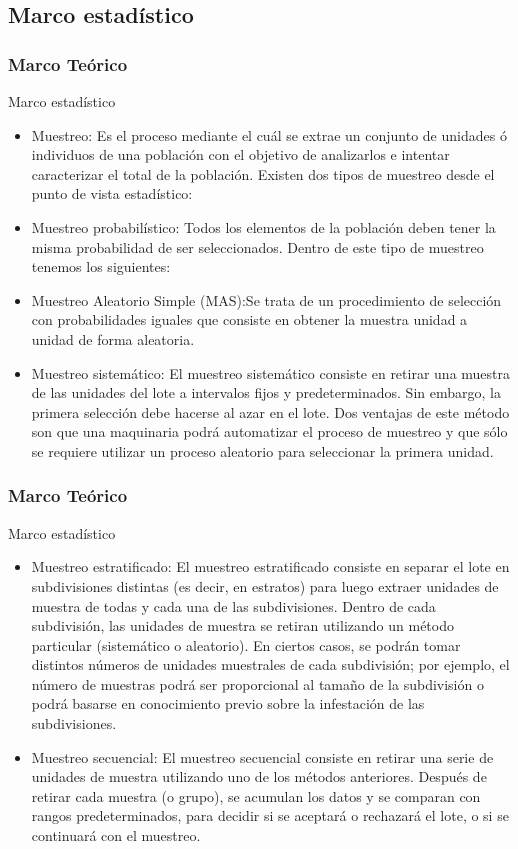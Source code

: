 \documentclass[10pt]{beamer}
\begin{document}
\subsection{Marco estadístico}
\begin{frame}
\frametitle{Marco Teórico}
\begin{block}{Marco estadístico}
\begin{itemize}
\justifying
\item Muestreo: Es el proceso mediante el cuál se extrae un conjunto de unidades ó individuos de una población con el objetivo de analizarlos e intentar caracterizar el total de la población. Existen dos tipos de muestreo desde el punto de vista estadístico:
\item Muestreo probabilístico: Todos los elementos de la población deben tener la misma probabilidad de ser seleccionados. Dentro de este tipo de muestreo tenemos los siguientes:
\item Muestreo Aleatorio Simple (MAS):Se trata de un procedimiento de selección con probabilidades iguales que consiste en obtener la muestra unidad a unidad de forma aleatoria.
\item Muestreo sistemático: El muestreo sistemático consiste en retirar una muestra de las unidades del lote a intervalos fijos y predeterminados. Sin
embargo, la primera selección debe hacerse al azar en el lote. Dos ventajas de este método son que una maquinaria podrá automatizar el proceso de muestreo y que sólo se requiere utilizar un proceso aleatorio para seleccionar la primera unidad.
\end{itemize}
\end{block}
\end{frame}

\begin{frame}
\frametitle{Marco Teórico}
\begin{block}{Marco estadístico}
\begin{itemize}
\justifying
\item Muestreo estratificado: El muestreo estratificado consiste en separar el lote en subdivisiones distintas (es decir, en estratos) para luego extraer
unidades de muestra de todas y cada una de las subdivisiones. Dentro de cada subdivisión, las unidades de muestra se
retiran utilizando un método particular (sistemático o aleatorio). En ciertos casos, se podrán tomar distintos números de
unidades muestrales de cada subdivisión; por ejemplo, el número de muestras podrá ser proporcional al tamaño de la
subdivisión o podrá basarse en conocimiento previo sobre la infestación de las subdivisiones.
\item Muestreo secuencial: El muestreo secuencial consiste en retirar una serie de unidades de muestra utilizando uno de los métodos anteriores. Después de retirar cada muestra (o grupo), se acumulan los datos y se comparan con rangos predeterminados, para decidir si se aceptará o rechazará el lote, o si se continuará con el muestreo.
\end{itemize}
\end{block}
\end{frame}
\end{document}
